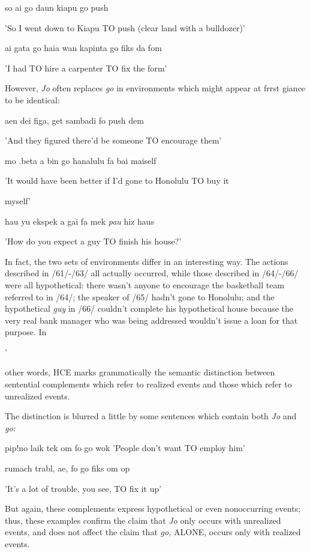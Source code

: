 \ea\label{ex:62}
so ai go daun kiapu go push
\glt
\z

'So I went down to Kiapu TO push (clear land with a bulldozer)'

\ea\label{ex:63}
ai gata go haia wan kapinta go fiks da fom
\glt
\z

'I had TO hire a carpenter TO fix the form'

However, \textit{Jo }often replaces \textit{go} in environments which might appear at frrst giance to be identical:

\ea\label{ex:64}
aen dei figa, get sambadi fo push dem
\glt
\z

'And they figured there'd be someone TO encourage them'

\ea\label{ex:65}
mo .beta a bin go hanalulu fa bai maiself
\glt
\z

'It would have been better if I'd gone to Honolulu TO buy it

myself'

\ea\label{ex:66}
hau yu ekspek a gai fa mek \textit{pau }hiz haus
\glt
\z

'How do you expect a guy TO finish his house?'

In fact, the two sets of environments differ in an interesting way. The actions described in /61/-/63/ all actually occurred, while those de\-scribed in /64/-/66/ were all hypothetical: there wasn't anyone to encourage the basketball team referred to in /64/; the speaker of /65/ hadn't gone to Honolulu; and the hypothetical \textit{guy} in /66/ couldn't complete his hypothetical house because the very real bank manager who was being addressed wouldn't issue a loan for that purpose. In

'


other words, HCE marks grammatically the semantic distinction be\-tween sentential complements which refer to realized events and those which refer to unrealized events.

The distinction is blurred a little by some sentences which contain both \textit{Jo} and \textit{go:}

\ea\label{ex:67}
pip!no laik tek om fo go wok 'People don't want TO employ him'
\glt
\z

\ea\label{ex:68}
rumach trabl, ae, fo go fiks om op
\glt
\z

'It's a lot of trouble, you see, TO fix it up'

But again, these complements express hypothetical or even nonoccur\-ring events; thus, these examples confirm the claim that \textit{Jo} only occurs with unrealized events, and does not affect the claim that \textit{go,} ALONE, occurs only with realized events.

